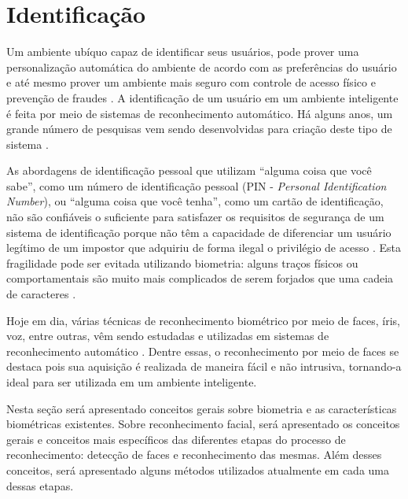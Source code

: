 	

\section{Identificação}
	
	Um ambiente ubíquo capaz de identificar seus usuários, pode prover uma
	personalização automática do ambiente de acordo com as preferências do usuário e
	até mesmo prover um ambiente mais seguro com controle de acesso físico e
	prevenção de fraudes \cite{saocarlos}. A identificação de um usuário em um
	ambiente inteligente é feita por meio de sistemas de reconhecimento automático.
	Há alguns anos, um grande número de pesquisas vem sendo desenvolvidas para criação
	deste tipo de sistema  \cite{saocarlos}.
	
	As abordagens de identificação pessoal que utilizam ``alguma coisa que você
	sabe'', como um número de identificação pessoal (PIN - \textit{Personal
	Identification Number}), ou ``alguma coisa que você tenha'', como um cartão de identificação,
	não são confiáveis o suficiente para satisfazer os requisitos de segurança de um
	sistema de identificação porque não têm a capacidade de diferenciar um usuário
	legítimo de um impostor que adquiriu de forma ilegal o privilégio de acesso
	\cite{hong}. Esta fragilidade pode ser evitada utilizando biometria: alguns
	traços físicos ou comportamentais são muito mais complicados de serem forjados
	que uma cadeia de caracteres \cite{drovetto}.
	
	Hoje em dia, várias técnicas de reconhecimento biométrico por meio de faces,
	íris, voz, entre outras, vêm sendo estudadas e utilizadas em sistemas de
	reconhecimento automático \cite{bolle}. Dentre essas, o reconhecimento por meio
	de faces se destaca pois sua aquisição é realizada de maneira fácil e não
	intrusiva, tornando-a ideal para ser utilizada em um ambiente inteligente.
	
	Nesta seção será apresentado conceitos gerais sobre biometria e as
	características biométricas existentes. Sobre reconhecimento facial, será
	apresentado os conceitos gerais e conceitos mais específicos das diferentes etapas do processo de reconhecimento: detecção
	de faces e reconhecimento das mesmas. Além desses conceitos, será apresentado
	alguns métodos utilizados atualmente em cada uma dessas etapas.


	
	





























